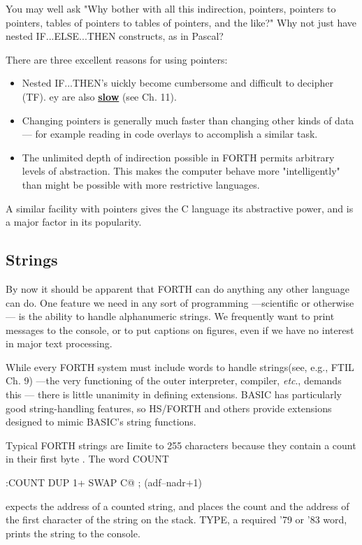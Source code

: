 You may well ask "Why bother with all this indirection, pointers, pointers to pointers, tables of pointers to tables of pointers, and the like?" Why not just have nested IF...ELSE...THEN constructs, as in Pascal?

There are three excellent reasons for using pointers:
\begin{itemize}
    \item Nested IF...THEN’s uickly become cumbersome and difficult to decipher (TF). ey are also \underline{\textbf{slow}} (see Ch. 11).
    \item Changing pointers is generally much faster than changing other kinds of data — for example reading in code overlays to accomplish a similar task.
    \item The unlimited depth of indirection possible in FORTH permits arbitrary levels of abstraction. This makes the computer behave more "intelligently" than might be possible with more restrictive languages.
\end{itemize}

A similar facility with pointers gives the C language its abstractive power, and is a major factor in its popularity.

\subsection{Strings}
By now it should be apparent that FORTH can do anything any other language can do. One feature we need in any sort of programming —scientific or otherwise — is the ability to handle alphanumeric strings. We frequently want to print messages to the console, or to put captions on figures, even if we have no interest in major text processing.

While every FORTH system must include words to handle strings(see, e.g., FTIL Ch. 9) —the very functioning of the outer interpreter, compiler, \textit{etc}., demands this — there is little unanimity in defining extensions. BASIC has particularly good string-handling features, so HS/FORTH and others provide extensions designed to mimic BASIC’s string functions.

Typical FORTH strings are Iimite to 255 characters because they
contain a count in their first byte . The word COUNT

:COUNT DUP 1+ SWAP C@ ; (adf--nadr+1)

expects the address of a counted string, and places the count and
the address of the first character of the string on the stack. TYPE,
a required ’79 or ’83 word, prints the string to the console.


